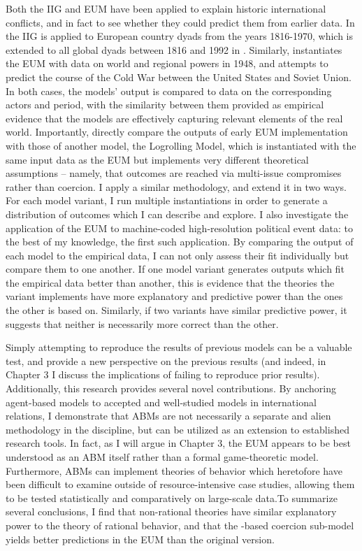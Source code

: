 Both the IIG and EUM have been applied to explain historic international conflicts, and in fact to see whether they could predict them from earlier data. In \citet{bdm_1992} the IIG is applied to European country dyads from the years 1816-1970, which is extended to all global dyads between 1816 and 1992 in \citet{bennett_2000}. Similarly, \citet{bdm_1998} instantiates the EUM with data on world and regional powers in 1948, and attempts to predict the course of the Cold War between the United States and Soviet Union. In both cases, the models' output is compared to data on the corresponding actors and period, with the similarity between them provided as empirical evidence that the models are effectively capturing relevant elements of the real world. Importantly, \citet{stokman_1994b} directly compare the outputs of early EUM implementation \citep{bdm_1994} with those of another model, the \citet{stokman_1994} Logrolling Model, which is instantiated with the same input data as the EUM but implements very different theoretical assumptions -- namely, that outcomes are reached via multi-issue compromises rather than coercion. I apply a similar methodology, and extend it in two ways. For each model variant, I run multiple instantiations in order to generate a distribution of outcomes which I can describe and explore. I also investigate the application of the EUM to machine-coded high-resolution political event data: to the best of my knowledge, the first such application. By comparing the output of each model to the empirical data, I can not only assess their fit individually but compare them to one another. If one model variant generates outputs which fit the empirical data better than another, this is evidence that the theories the variant implements have more explanatory and predictive power than the ones the other is based on. Similarly, if two variants have similar predictive power, it suggests that neither is necessarily more correct than the other.

Simply attempting to reproduce the results of previous models can be a valuable test, and provide a new perspective on the previous results (and indeed, in Chapter 3 I discuss the implications of failing to reproduce prior results). Additionally, this research provides several novel contributions. By anchoring agent-based models to accepted and well-studied models in international relations, I demonstrate that ABMs are not necessarily a separate and alien methodology in the discipline, but can be utilized as an extension to established research tools. In fact, as I will argue in Chapter 3, the EUM appears to be best understood as an ABM itself rather than a formal game-theoretic model. Furthermore, ABMs can implement theories of behavior which heretofore have been difficult to examine outside of resource-intensive case studies, allowing them to be tested statistically and comparatively on large-scale data.To summarize several conclusions, I find that non-rational theories have similar explanatory power to the theory of rational behavior, and that the \citet{schelling_1966}-based coercion sub-model yields better predictions in the EUM than the original version.

